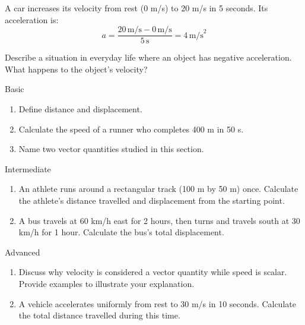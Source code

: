 
\begin{example}
A car increases its velocity from rest (0 m/s) to 20 m/s in 5 seconds. Its acceleration is:
\[
a = \frac{20\,\text{m/s} - 0\,\text{m/s}}{5\,\text{s}} = 4\,\text{m/s}^2
\]
\end{example}

\begin{stopandthink}
Describe a situation in everyday life where an object has negative acceleration. What happens to the object's velocity?
\end{stopandthink}

\begin{tieredquestions}{Basic}
\begin{enumerate}
    \item Define distance and displacement.
    \item Calculate the speed of a runner who completes 400 m in 50 s.
    \item Name two vector quantities studied in this section.
\end{enumerate}
\end{tieredquestions}

\begin{tieredquestions}{Intermediate}
\begin{enumerate}
    \item An athlete runs around a rectangular track (100 m by 50 m) once. Calculate the athlete's distance travelled and displacement from the starting point.
    \item A bus travels at 60 km/h east for 2 hours, then turns and travels south at 30 km/h for 1 hour. Calculate the bus’s total displacement.
\end{enumerate}
\end{tieredquestions}

\begin{tieredquestions}{Advanced}
\begin{enumerate}
    \item Discuss why velocity is considered a vector quantity while speed is scalar. Provide examples to illustrate your explanation.
    \item A vehicle accelerates uniformly from rest to 30 m/s in 10 seconds. Calculate the total distance travelled during this time.
\end{enumerate}
\end{tieredquestions}

